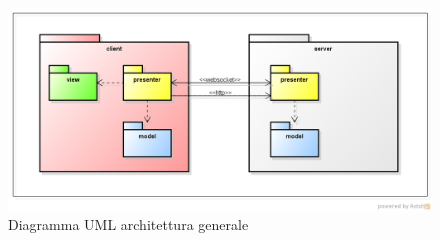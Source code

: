 \begin{figure}[H] \centering \includegraphics[width=%
\textwidth]
{./other/MVPIntroduzione.png} \caption{Diagramma UML architettura generale}
\end{figure}